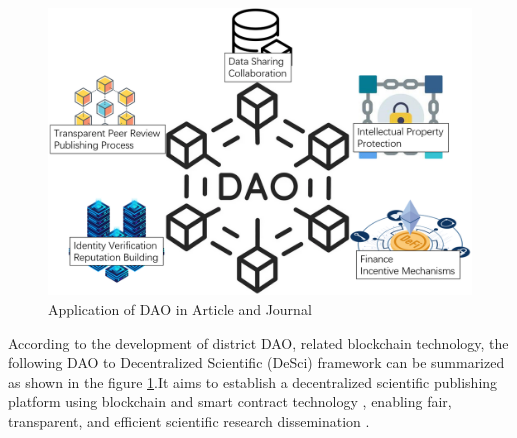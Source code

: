 \documentclass[lettersize,journal]{IEEEtran}
\begin{document}
\begin{figure}[h!]
  \centering
  \includegraphics[width=\linewidth]{assets/dao.png}
  \caption{Application of DAO in Article and Journal}
  \label{fig:applicationofdao}
\end{figure}


According to the development of district DAO, related blockchain technology, the following DAO to Decentralized Scientific (DeSci) framework can be summarized as shown in the figure \ref{fig:applicationofdao}.It aims to establish a decentralized scientific publishing platform using blockchain and smart contract technology \cite{szabo1996smart}, enabling fair, transparent, and efficient scientific research dissemination \cite{wang2022dao}\cite{10394624}\cite{shilina2023decentralized}.
\end{document}
